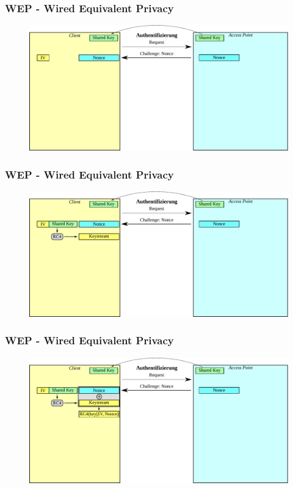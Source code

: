 \documentclass{beamer}
\begin{document}
\begin{frame}
\frametitle{WEP - Wired Equivalent Privacy}
\begin{figure}
	\includegraphics[width=1.0\linewidth]{figures/WEP_auth_3.pdf}
\end{figure}
\end{frame}

\begin{frame}
\frametitle{WEP - Wired Equivalent Privacy}
\begin{figure}
	\includegraphics[width=1.0\linewidth]{figures/WEP_auth_4.pdf}
\end{figure}
\end{frame}

\begin{frame}
\frametitle{WEP - Wired Equivalent Privacy}
\begin{figure}
	\includegraphics[width=1.0\linewidth]{figures/WEP_auth_5.pdf}
\end{figure}
\end{frame}
\end{document}

